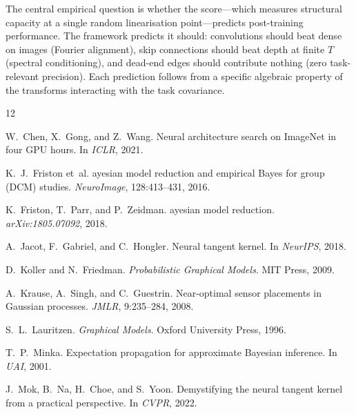 \documentclass[11pt, a4paper]{article}
\begin{document}
The central empirical question is whether the score---which measures structural capacity at a single random linearisation point---predicts post-training performance.
The framework predicts it should: convolutions should beat dense on images (Fourier alignment), skip connections should beat depth at finite $T$ (spectral conditioning), and dead-end edges should contribute nothing (zero task-relevant precision).
Each prediction follows from a specific algebraic property of the transforms interacting with the task covariance.



\begin{thebibliography}{12}

W.~Chen, X.~Gong, and Z.~Wang.
\newblock Neural architecture search on {ImageNet} in four {GPU} hours.
\newblock In \emph{ICLR}, 2021.

K.~J.~Friston et~al.
ayesian model reduction and empirical {B}ayes for group ({DCM}) studies.
\newblock \emph{NeuroImage}, 128:413--431, 2016.

K.~Friston, T.~Parr, and P.~Zeidman.
ayesian model reduction.
\newblock \emph{arXiv:1805.07092}, 2018.

A.~Jacot, F.~Gabriel, and C.~Hongler.
\newblock Neural tangent kernel.
\newblock In \emph{NeurIPS}, 2018.

D.~Koller and N.~Friedman.
\newblock \emph{Probabilistic Graphical Models}.
\newblock MIT Press, 2009.

A.~Krause, A.~Singh, and C.~Guestrin.
\newblock Near-optimal sensor placements in {Gaussian} processes.
\newblock \emph{JMLR}, 9:235--284, 2008.

S.~L.~Lauritzen.
\newblock \emph{Graphical Models}.
\newblock Oxford University Press, 1996.

T.~P.~Minka.
\newblock Expectation propagation for approximate {Bayesian} inference.
\newblock In \emph{UAI}, 2001.

J.~Mok, B.~Na, H.~Choe, and S.~Yoon.
\newblock Demystifying the neural tangent kernel from a practical perspective.
\newblock In \emph{CVPR}, 2022.


\end{thebibliography}
\end{document}
